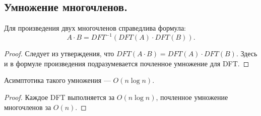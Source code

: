\subsection{Умножение многочленов.}
\begin{remark}
  Для произведения двух многочленов справедлива формула:
  \[
    A \cdot B = DFT^{-1} \left( DFT(A) \cdot DFT(B)  \right) 
  .\] 
\end{remark}
\begin{proof}
  Следует из утверждения, что $DFT(A \cdot B) = DFT(A) \cdot DFT(B)$.
  Здесь и в формуле произведения подразумевается почленное умножение для DFT.
\end{proof}

\begin{remark}
  Асимптотика такого умножения --- $O(n \log n)$.
\end{remark}
\begin{proof}
  Каждое DFT выполняется за $O(n \log n)$, почленное умножение многочленов за $O(n)$. 
\end{proof}

